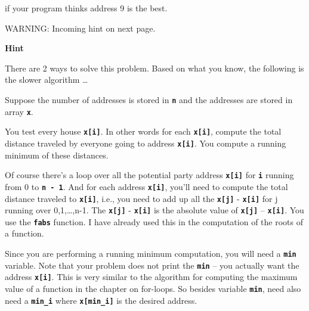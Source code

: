 if your program thinks address 9 is the best.

WARNING: Incoming hint on next page.

\textbf{Hint}

There are 2 ways to solve this problem. Based on what you know, the following is the slower algorithm \ldots

Suppose the number of addresses is stored in \texttt{\textbf{n}} and the addresses are stored in array \texttt{\textbf{x}}.

You test every house \texttt{\textbf{x[i]}}. In other words for each \texttt{\textbf{x[i]}}, compute the total distance traveled by everyone going to address \texttt{\textbf{x[i]}}. You compute a running minimum of these distances.

Of course there's a loop over all the potential party address \texttt{\textbf{x[i]}} for \texttt{\textbf{i}} running from 0 to \texttt{\textbf{n - 1}}. And for each address \texttt{\textbf{x[i]}}, you'll need to compute the total distance traveled to \texttt{\textbf{x[i]}}, i.e., you need to add up all the \texttt{\textbf{x[j]}} - \texttt{\textbf{x[i]}} for j running over 0,1,\ldots,n-1. The \texttt{\textbf{x[j]}} - \texttt{\textbf{x[i]}} is the absolute value of \texttt{\textbf{x[j]}} -- \texttt{\textbf{x[i]}}. You use the \texttt{\textbf{fabs}} function. I have already used this in the computation of the roots of a function.

Since you are performing a running minimum computation, you will need a \texttt{\textbf{min}} variable. Note that your problem does not print the \texttt{\textbf{min}} -- you actually want the address \texttt{\textbf{x[i]}}. This is very similar to the algorithm for computing the maximum value of a function in the chapter on for-loops. So besides variable \texttt{\textbf{min}}, need also need a \texttt{\textbf{min\_i}} where \texttt{\textbf{x[min\_i]}} is the desired address.

